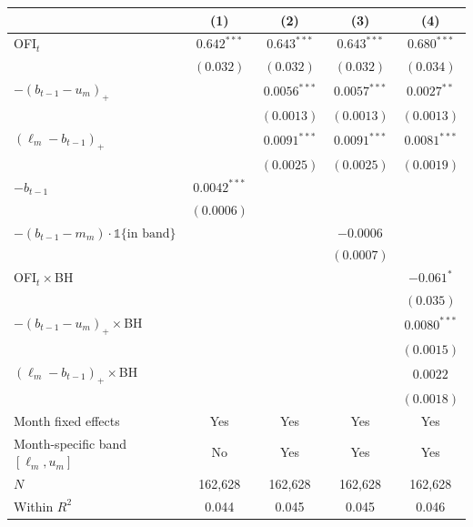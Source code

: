\begin{tabular}{lcccc}
\toprule
 & (1) & (2) & (3) & (4) \\
\midrule
OFI$_t$ & $0.642^{***}$ & $0.643^{***}$ & $0.643^{***}$ & $0.680^{***}$ \\
 & $(0.032)$ & $(0.032)$ & $(0.032)$ & $(0.034)$ \\
$-(b_{t-1}-u_m)_+$ \;[$\kappa^+$] &  & $0.0056^{***}$ & $0.0057^{***}$ & $0.0027^{**}$ \\
 &  & $(0.0013)$ & $(0.0013)$ & $(0.0013)$ \\
$(\ell_m-b_{t-1})_+$ \;[$\kappa^-$] &  & $0.0091^{***}$ & $0.0091^{***}$ & $0.0081^{***}$ \\
 &  & $(0.0025)$ & $(0.0025)$ & $(0.0019)$ \\
$-b_{t-1}$  & $0.0042^{***}$ &  &  &  \\
 & $(0.0006)$ &  &  &  \\
$-(b_{t-1}-m_m)\cdot\mathbb 1\{\text{in band}\}$ &  &  & $-0.0006$ &  \\
 &  &  & $(0.0007)$ &  \\
OFI$_t\times$BH &  &  &  & $-0.061^{*}$ \\
 &  &  &  & $(0.035)$ \\
$-(b_{t-1}-u_m)_+\times$BH &  &  &  & $0.0080^{***}$ \\
 &  &  &  & $(0.0015)$ \\
$(\ell_m-b_{t-1})_+\times$BH &  &  &  & $0.0022$ \\
 &  &  &  & $(0.0018)$ \\
\midrule
Month fixed effects & Yes & Yes & Yes & Yes \\
Month-specific band $[\ell_m,u_m]$ & No & Yes & Yes & Yes \\
$N$ & 162,628 & 162,628 & 162,628 & 162,628 \\
Within $R^2$ & 0.044 & 0.045 & 0.045 & 0.046 \\
\bottomrule
\end{tabular}

